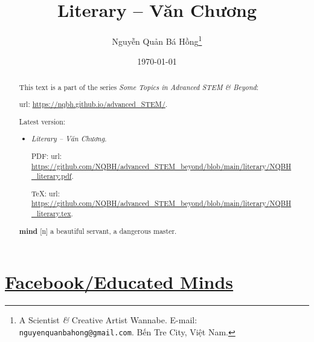 \documentclass{article}
\title{Literary -- Văn Chương}
\author{Nguyễn Quản Bá Hồng\footnote{A Scientist {\it\&} Creative Artist Wannabe. E-mail: {\tt nguyenquanbahong@gmail.com}. Bến Tre City, Việt Nam.}}
\date{\today}
\begin{document}
\maketitle
\begin{abstract}
	This text is a part of the series {\it Some Topics in Advanced STEM \& Beyond}:
	
	{\sc url}: \url{https://nqbh.github.io/advanced_STEM/}.
	
	Latest version:
	\begin{itemize}
		\item {\it Literary -- Văn Chương}.
		
		PDF: {\sc url}: \url{https://github.com/NQBH/advanced_STEM_beyond/blob/main/literary/NQBH_literary.pdf}.
		
		\TeX: {\sc url}: \url{https://github.com/NQBH/advanced_STEM_beyond/blob/main/literary/NQBH_literary.tex}.
	\end{itemize}
\end{abstract}
\tableofcontents


\section{\href{https://www.facebook.com/EducatedMindsPage}{Facebook/Educated Minds}}

\begin{abstract}
	\textbf{mind} [n] a beautiful servant, a dangerous master.
\end{abstract}
\end{document}
